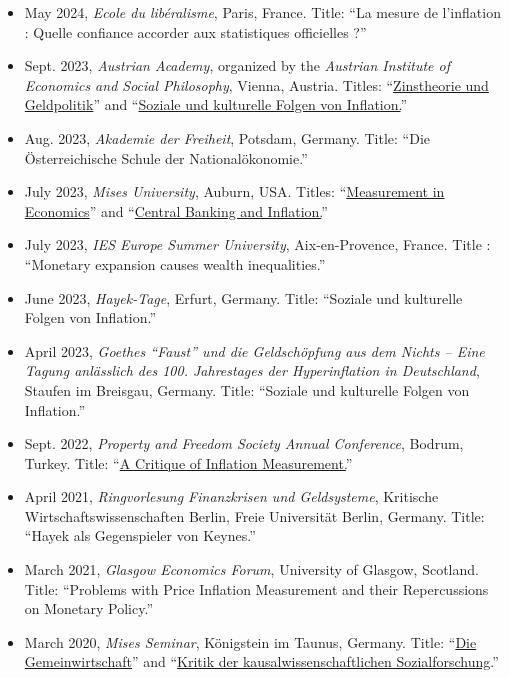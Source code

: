 \documentclass[11pt]{article}
\begin{document}
\begin{itemize}
    \item May 2024, \textit{Ecole du libéralisme}, Paris, France. Title: ``La mesure de l’inflation : Quelle confiance accorder aux statistiques officielles ?'' 
    \item Sept. 2023, \textit{Austrian Academy}, organized by the \textit{Austrian Institute of Economics and Social Philosophy}, Vienna, Austria. Titles: ``\href{https://www.youtube.com/watch?v=MV5clguY3OY}{Zinstheorie und Geldpolitik}'' and ``\href{https://www.youtube.com/watch?v=L_o1eViRC8U&t=13s}{Soziale und kulturelle Folgen von Inflation.}'' 
    \item Aug. 2023, \textit{Akademie der Freiheit}, Potsdam, Germany. Title: ``Die Österreichische Schule der Nationalökonomie.''
    \item July 2023, \textit{Mises University}, Auburn, USA. Titles: ``\href{https://www.youtube.com/watch?v=sNOMNQbIXGQ&t=1s}{Measurement in Economics}'' and ``\href{https://www.youtube.com/watch?v=hEjZWC0Jpu0&t=5s}{Central Banking and Inflation.}'' 
    \item July 2023, \textit{IES Europe Summer University}, Aix-en-Provence, France. Title : ``Monetary expansion causes wealth inequalities.'' 
    \item June 2023, \textit{Hayek-Tage}, Erfurt, Germany. Title: ``Soziale und kulturelle Folgen von Inflation.'' 
    \item April 2023, \textit{Goethes ``Faust'' und die Geldschöpfung aus dem Nichts – Eine Tagung anlässlich des 100. Jahrestages der Hyperinflation in Deutschland}, Staufen im Breisgau, Germany. Title: ``Soziale und kulturelle Folgen von Inflation.''  
    \item Sept. 2022, \textit{Property and Freedom Society Annual Conference}, Bodrum, Turkey. Title: ``\href{https://www.youtube.com/watch?v=JzVJWNDnTlo&t=14s}{A Critique of Inflation Measurement.}''
    \item April 2021, \textit{Ringvorlesung Finanzkrisen und Geldsysteme}, Kritische Wirtschaftswissenschaften Berlin, Freie Universität Berlin, Germany. Title: ``Hayek als Gegenspieler von Keynes.''
    \item March 2021, \textit{Glasgow Economics Forum}, University of Glasgow, Scotland. Title: ``Problems with Price Inflation Measurement and their Repercussions on Monetary Policy.''
    \item March 2020, \textit{Mises Seminar}, Königstein im Taunus, Germany. Title: ``\href{https://www.youtube.com/watch?v=CfNSBYTP3Hg}{Die Gemeinwirtschaft}'' and ``\href{https://www.youtube.com/watch?v=FENXx3mxxgI}{Kritik der kausalwissenschaftlichen Sozialforschung}.''
\end{itemize}
\end{document}
